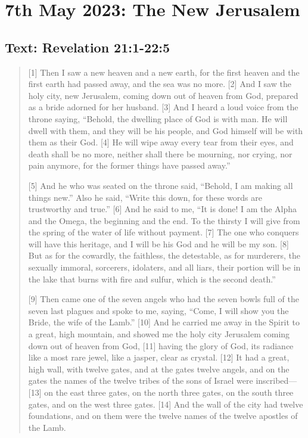 \setcounter{figure}{0}

\section{7th May 2023: The New Jerusalem}
\subsection*{Text: Revelation 21:1-22:5}
  \begin{quote}
    [1] Then I saw a new heaven and a new earth, for the first heaven and the
    first earth had passed away, and the sea was no more. [2] And I saw the
    holy city, new Jerusalem, coming down out of heaven from God, prepared as
    a bride adorned for her husband. [3] And I heard a loud voice from the
    throne saying, “Behold, the dwelling place of God is with man. He will
    dwell with them, and they will be his people, and God himself will be
    with them as their God. [4] He will wipe away every tear from their eyes,
    and death shall be no more, neither shall there be mourning, nor crying,
    nor pain anymore, for the former things have passed away.”

    [5] And he who was seated on the throne said, “Behold, I am making all
    things new.” Also he said, “Write this down, for these words are
    trustworthy and true.” [6] And he said to me, “It is done! I am the Alpha
    and the Omega, the beginning and the end. To the thirsty I will give from
    the spring of the water of life without payment. [7] The one who conquers
    will have this heritage, and I will be his God and he will be my son. [8]
    But as for the cowardly, the faithless, the detestable, as for murderers,
    the sexually immoral, sorcerers, idolaters, and all liars, their portion
    will be in the lake that burns with fire and sulfur, which is the second
    death.”

    [9] Then came one of the seven angels who had the seven bowls full of the
    seven last plagues and spoke to me, saying, “Come, I will show you the
    Bride, the wife of the Lamb.” [10] And he carried me away in the Spirit
    to a great, high mountain, and showed me the holy city Jerusalem coming
    down out of heaven from God, [11] having the glory of God, its radiance
    like a most rare jewel, like a jasper, clear as crystal. [12] It had a
    great, high wall, with twelve gates, and at the gates twelve angels, and
    on the gates the names of the twelve tribes of the sons of Israel were
    inscribed—[13] on the east three gates, on the north three gates, on the
    south three gates, and on the west three gates. [14] And the wall of the
    city had twelve foundations, and on them were the twelve names of the
    twelve apostles of the Lamb.


\end{quote}
